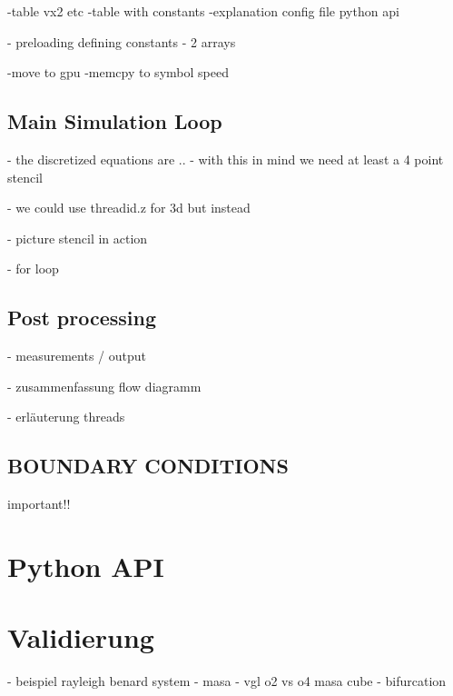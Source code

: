 -table vx2  etc
-table with constants
-explanation config file python api

- preloading defining constants
- 2 arrays

-move to gpu
-memcpy to symbol speed

\subsection{Main Simulation Loop}
- the discretized equations are ..
- with this in mind we need at least a 4 point stencil

- we could use threadid.z for 3d but instead

- picture stencil in action

- for loop

\subsection{Post processing}
- measurements / output

- zusammenfassung flow diagramm

- erläuterung threads


\subsection{BOUNDARY CONDITIONS}
important!!

\section{Python API}

\section{Validierung}
- beispiel rayleigh benard system
- masa
- vgl o2 vs o4 masa cube
- bifurcation

\newpage

